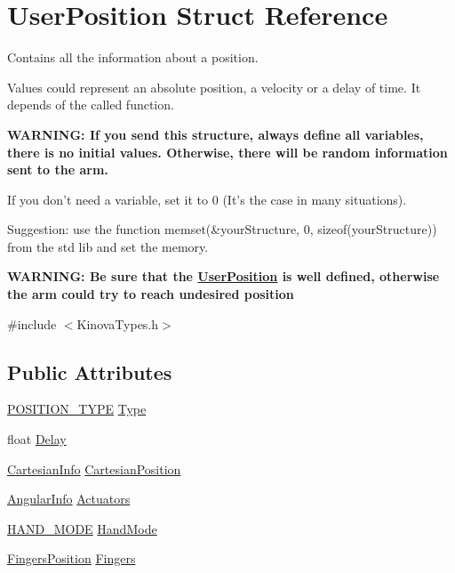 \hypertarget{struct_user_position}{\section{User\-Position Struct Reference}
\label{struct_user_position}
}


\par
Contains all the information about a position. \par
Values could represent an absolute position, a velocity or a delay of time. It depends of the called function. \par
{\bfseries W\-A\-R\-N\-I\-N\-G\-: If you send this structure, always define all variables, there is no initial values. Otherwise, there will be random information sent to the arm.} \par
If you don't need a variable, set it to 0 (It's the case in many situations). \par
Suggestion\-: use the function memset(\&your\-Structure, 0, sizeof(your\-Structure)) from the std lib and set the memory. \par
{\bfseries W\-A\-R\-N\-I\-N\-G\-: Be sure that the \hyperlink{struct_user_position}{User\-Position} is well defined, otherwise the arm could try to reach undesired position}  




{\ttfamily \#include $<$Kinova\-Types.\-h$>$}

\subsection*{Public Attributes}
\begin{DoxyCompactItemize}
\item 
\hyperlink{_kinova_types_8h_a0a1c22d235ef1b13cfcd1419d10babc9}{P\-O\-S\-I\-T\-I\-O\-N\-\_\-\-T\-Y\-P\-E} \hyperlink{struct_user_position_a93c748d4ee51239fcbcd487d88e52ffa}{Type}
\item 
float \hyperlink{struct_user_position_aa18896c1238a50c8ad81c66dfd76ac5e}{Delay}
\item 
\hyperlink{struct_cartesian_info}{Cartesian\-Info} \hyperlink{struct_user_position_ab363c40971853637f728978e604c438f}{Cartesian\-Position}
\item 
\hyperlink{struct_angular_info}{Angular\-Info} \hyperlink{struct_user_position_ab0c5b71622c1e0d3033572578e947cf3}{Actuators}
\item 
\hyperlink{_kinova_types_8h_ad7050e4cfb6e844e9be962fba8eeb817}{H\-A\-N\-D\-\_\-\-M\-O\-D\-E} \hyperlink{struct_user_position_a83779902810d0e5e16d533e0f964c0df}{Hand\-Mode}
\item 
\hyperlink{struct_fingers_position}{Fingers\-Position} \hyperlink{struct_user_position_a727907bb6a98b0f3d10aaa8011b67927}{Fingers}
\end{DoxyCompactItemize}


